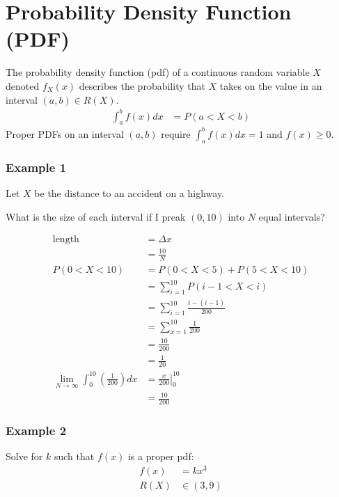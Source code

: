             \section{Probability Density Function (PDF)} %
            \label{sec:probability_density_function_pdf}
                The probability density function (pdf) of a continuous random variable $X$ denoted $f_X(x)$ describes the probability that $X$ takes on the value in an interval $(a, b) \in R(X)$.
                \begin{align*}
                    \int_a^b f(x) dx &= P(a < X < b)
                \end{align*}
                Proper PDFs on an interval $(a, b)$ require $\int_a^b f(x) dx = 1$ and $f(x) \ge 0$.

                \subsubsection{Example 1} %
                \label{ssub:example_1}
                    Let $X$ be the distance to an accident on a highway.

                    What is the size of each interval if I preak $(0, 10)$ into $N$ equal intervals?

                    \begin{align*}
                        \text{length} &= \Delta x \\
                        &= \frac{10}{N} \\
                        P(0 < X < 10) &= P(0 < X < 5) + P(5 < X < 10) \\
                        &= \sum_{i=1}^{10} P(i - 1 < X < i) \\
                        &= \sum_{i=1}^{10} \frac{i - (i - 1)}{200} \\
                        &= \sum_{x=1}^{10} \frac{1}{200} \\
                        &= \frac{10}{200} \\
                        &= \frac{1}{20} \\
                        \lim_{N \to \infty} \int_0^{10} \left( \frac{1}{200} \right) dx &= \left. \frac{x}{200} \right|_0^{10} \\
                        &= \frac{10}{200}
                    \end{align*}
                \subsubsection{Example 2} %
                \label{ssub:example_2}
                    Solve for $k$ such that $f(x)$ is a proper pdf:
                    \begin{align*}
                        f(x) &= kx^3 \\
                        R(X) &\in (3, 9)
                    \end{align*}

